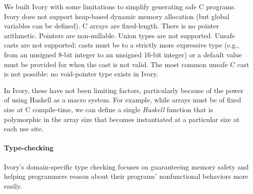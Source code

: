 We built Ivory with some limitations to simplify generating safe C programs.
Ivory does not support heap-based dynamic memory allocation (but global
variables can be defined).  C arrays are fixed-length.  There is no pointer
arithmetic.  Pointers are non-nullable.  Union types are not supported.  Unsafe
casts are not supported: casts must be to a strictly more expressive type (e.g.,
from an unsigned 8-bit integer to an unsigned 16-bit integer) or a default value
must be provided for when the cast is not valid. The most common unsafe C cast
is not possible: no void-pointer type exists in Ivory.

In Ivory, these have not been limiting factors, particularly because of the
power of using Haskell as a macro system.  For example, while arrays must be of
fixed size at C compile-time, we can define a single \emph{Haskell} function
that is polymorphic in the array size that becomes instantiated at a particular
size at each use site.  %


\paragraph{Type-checking}
Ivory's domain-specific type checking focuses on guaranteeing memory
safety and helping programmers reason about their programs' nonfunctional
behaviors more easily.



